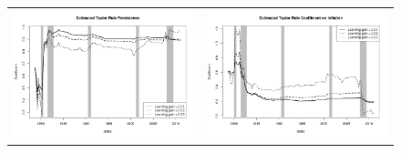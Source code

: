 \documentclass[12pt]{article}
\begin{document}
\begin{figure}
\begin{tabular}{cc}
\includegraphics[scale=0.4]{coef_persistence_ols.png} & \includegraphics[scale=0.4]{coef_inflation_ols.png} \\

\end{tabular}
\end{figure}
\end{document}
